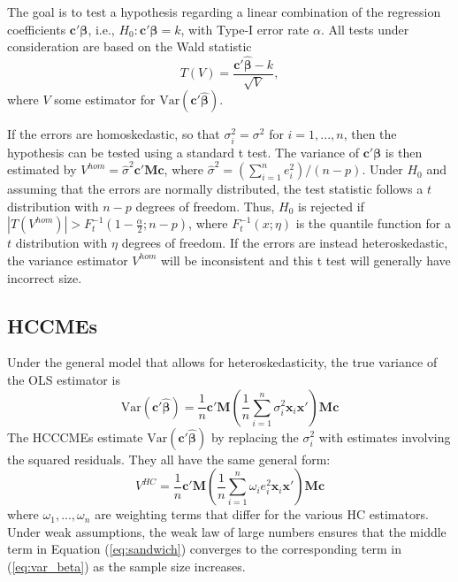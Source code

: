 \documentclass[12pt]{article}\usepackage[]{graphicx}\usepackage[]{color}
\newcommand{\Var}{\text{Var}}
\newcommand{\bm}{\mathbf}
\newcommand{\bs}{\boldsymbol}
\begin{document}
The goal is to test a hypothesis regarding a linear combination of the regression coefficients $\bm{c}'\bs\beta$, i.e., $H_0: \bm{c}'\bs\beta = k$, with Type-I error rate $\alpha$. 
All tests under consideration are based on the Wald statistic
\begin{equation}
T(V) = \frac{\bm{c}'\bs{\hat\beta} - k}{\sqrt{V}},
\end{equation}
where $V$ some estimator for $\Var\left(\bm{c}'\bs{\hat\beta}\right)$. 

If the errors are homoskedastic, so that $\sigma_i^2 = \sigma^2$ for $i = 1,...,n$, then the hypothesis can be tested using a standard t test. 
The variance of $\bm{c}'\bs\beta$ is then estimated by $V^{hom} = \hat\sigma^2 \bm{c}'\bm{M}\bm{c}$, where $\hat\sigma^2 = \left(\sum_{i=1}^n e_i^2\right) / (n - p)$. 
Under $H_0$ and assuming that the errors are normally distributed, the test statistic follows a $t$ distribution with $n - p$ degrees of freedom. 
Thus, $H_0$ is rejected if $\left|T\left(V^{hom}\right)\right| > F_t^{-1}\left(1 - \frac{\alpha}{2}; n - p\right)$, where $F_t^{-1}(x; \eta)$ is the quantile function for a $t$ distribution with $\eta$ degrees of freedom. 
If the errors are instead heteroskedastic, the variance estimator $V^{hom}$ will be inconsistent and this t test will generally have incorrect size. 

\subsection{HCCMEs}

Under the general model that allows for heteroskedasticity, the true variance of the OLS estimator is 
\begin{equation}
\label{eq:var_beta}
\Var\left(\bm{c}'\bs{\hat\beta}\right) = \frac{1}{n} \bm{c}'\bm{M} \left(\frac{1}{n}\sum_{i=1}^n \sigma_i^2 \bm{x}_i\bm{x}'\right) \bm{M}\bm{c}
\end{equation}
The HCCCMEs estimate $\Var\left(\bm{c}'\bs{\hat\beta}\right)$ by replacing the $\sigma_i^2$ with estimates involving the squared residuals. They all have the same general form:  
\begin{equation}
\label{eq:sandwich}
V^{HC} = \frac{1}{n} \bm{c}'\bm{M} \left(\frac{1}{n}\sum_{i=1}^n \omega_i e_i^2 \bm{x}_i\bm{x}'\right)\bm{M} \bm{c}
\end{equation}
where $\omega_{1},...,\omega_{n}$ are weighting terms that differ for the various HC estimators. 
Under weak assumptions, the weak law of large numbers ensures that the middle term in Equation (\ref{eq:sandwich}) converges to the corresponding term in (\ref{eq:var_beta}) as the sample size increases. 
\end{document}
